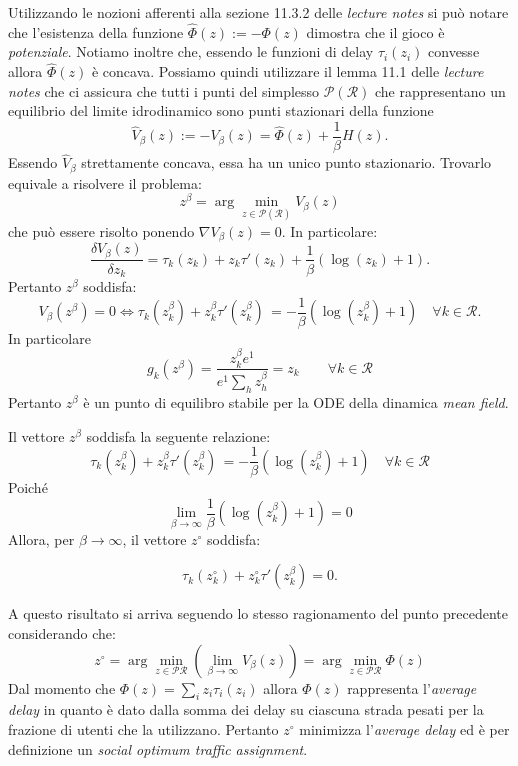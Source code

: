 \begin{alphaparts}
    Utilizzando le nozioni afferenti alla sezione 11.3.2 delle \textit{lecture notes} si può notare che l'esistenza della funzione \( \hat{\Phi}(z) := - \Phi(z)\) dimostra che il gioco è \textit{potenziale}. Notiamo inoltre che, essendo le funzioni di delay \(\tau_i(z_i)\) convesse allora \(\hat{\Phi}(z)\) è concava. Possiamo quindi utilizzare il lemma 11.1 delle \textit{lecture notes} che ci assicura che tutti i punti del simplesso \(\mathcal{P}(\mathcal{R})\) che rappresentano un equilibrio del limite idrodinamico sono punti stazionari della funzione 
    \[
     \hat{V}_\beta(z) := - V_\beta(z) = \hat{\Phi}(z) + \frac{1}{\beta}H(z).   
    \]
    Essendo \(\hat{V}_\beta \) strettamente concava, essa ha un unico punto stazionario. Trovarlo equivale a risolvere il problema:
    \begin{equation*}
        z^\beta = \arg\min \limits_{z \in \mathcal{P}(\mathcal{R})} V_\beta(z)
    \end{equation*}
    che può essere risolto ponendo \(\nabla V_\beta(z) = 0 \).
    In particolare:
    \[
    \frac{\delta V_\beta(z)}{\delta z_k} = \tau_{k}(z_{k}) + z_{k}\tau'(z_{k})  + \frac{1}{\beta}(\log(z_k)+ 1).  
    \]
    Pertanto \(z^\beta\) soddisfa:
    \[
        V_\beta(z^\beta) = 0 \iff \tau_{k}(z_{k}^\beta) + z_{k}^\beta\tau'(z_{k}^\beta)\, = - \frac{1}{\beta}(\log(z_k^\beta)+ 1) \quad \forall k \in \mathcal{R}. 
    \]
    In particolare
    \[
        g_k(z^\beta) = \frac{z_k^\beta e^1}{e^1  \sum \limits_{h}^{} z^\beta_h} = z_k \quad \quad \forall k \in \mathcal{R}\]
    Pertanto \(z^\beta\) è un punto di equilibro stabile per la ODE della dinamica \textit{mean field}.

    \questionpart
    Il vettore \(z^\beta\) soddisfa la seguente relazione:
    \[
        \tau_{k}(z_{k}^\beta) + z_{k}^\beta\tau'(z_{k}^\beta)\, = - \frac{1}{\beta}(\log(z_k^\beta)+ 1) \quad \forall k \in \mathcal{R}
        \]
    Poiché 
    \[
    \lim_{\beta \to \infty} \frac{1}{\beta} (\log (z^\beta_k) + 1) = 0    
    \]
    Allora, per \(\beta \to \infty\), il vettore \(z^\circ\) soddisfa:

    \[
        \tau_{k}(z_{k}^\circ) + z_{k}^\circ\tau'(z_{k}^\beta)= 0 .   
    \]

    A questo risultato si arriva seguendo lo stesso ragionamento del punto precedente considerando che:
    \[
    z^\circ = \arg\min \limits_{z \in \mathcal{P}\mathcal{R}} \left( \lim_{\beta \to \infty} V_\beta(z)\right) =   \arg\min \limits_{z \in \mathcal{P}\mathcal{R}} \Phi(z)
    \]
    Dal momento che \(\Phi(z) =  \sum \limits_{i}^{} z
    _i \tau_i(z_i)\) allora \(\Phi(z)\) rappresenta l'\textit{average delay} in quanto è dato dalla somma dei delay su ciascuna strada pesati per la frazione di utenti che la utilizzano. Pertanto \(z^\circ\) minimizza l'\textit{average delay} ed è per definizione un \textit{social optimum traffic assignment}.
   
\end{alphaparts}